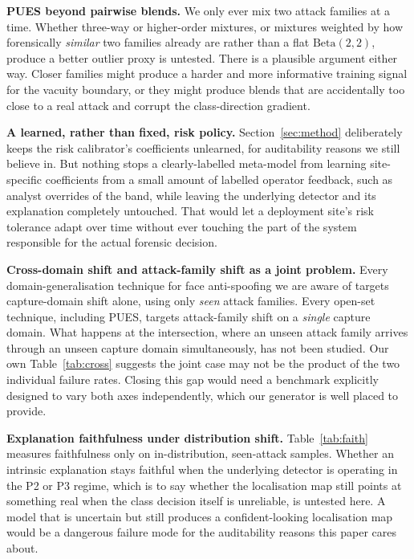 \documentclass[conference]{IEEEtran}
\begin{document}
\textbf{PUES beyond pairwise blends.} We only ever mix two attack families at a time.
Whether three-way or higher-order mixtures, or mixtures weighted by how forensically
\emph{similar} two families already are rather than a flat $\mathrm{Beta}(2,2)$,
produce a better outlier proxy is untested. There is a plausible argument either way.
Closer families might produce a harder and more informative training signal for the
vacuity boundary, or they might produce blends that are accidentally too close to a
real attack and corrupt the class-direction gradient.

\textbf{A learned, rather than fixed, risk policy.} Section~\ref{sec:method}
deliberately keeps the risk calibrator's coefficients unlearned, for auditability
reasons we still believe in. But nothing stops a clearly-labelled meta-model from
learning site-specific coefficients from a small amount of labelled operator
feedback, such as analyst overrides of the band, while leaving the underlying
detector and its explanation completely untouched. That would let a deployment site's
risk tolerance adapt over time without ever touching the part of the system
responsible for the actual forensic decision.

\textbf{Cross-domain shift and attack-family shift as a joint problem.} Every
domain-generalisation technique for face anti-spoofing we are aware of
\cite{wang2022ssan,shao2019mada,jia2020ssdg} targets capture-domain shift alone,
using only \emph{seen} attack families. Every open-set technique, including PUES,
targets attack-family shift on a \emph{single} capture domain. What happens at the
intersection, where an unseen attack family arrives through an unseen capture domain
simultaneously, has not been studied. Our own Table~\ref{tab:cross} suggests the joint
case may not be the product of the two individual failure rates. Closing this
gap would need a benchmark explicitly designed to vary both axes independently, which
our generator is well placed to provide.

\textbf{Explanation faithfulness under distribution shift.} Table~\ref{tab:faith}
measures faithfulness only on in-distribution, seen-attack samples. Whether an
intrinsic explanation stays faithful when the underlying detector is operating in the
P2 or P3 regime, which is to say whether the localisation map still points at
something real when the class decision itself is unreliable, is untested here. A
model that is uncertain but still produces a confident-looking localisation map would
be a dangerous failure mode for the auditability reasons this paper
cares about.
\end{document}
